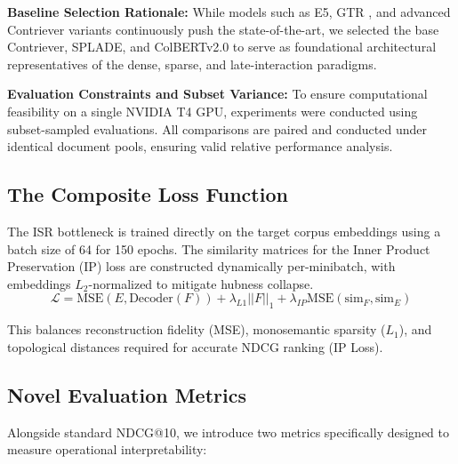 \documentclass[sigconf,authordraft]{acmart}
\begin{document}
\textbf{Baseline Selection Rationale:} While models such as E5, GTR \cite{wang2022}, and advanced Contriever variants continuously push the state-of-the-art, we selected the base Contriever, SPLADE, and ColBERTv2.0 to serve as foundational architectural representatives of the dense, sparse, and late-interaction paradigms.

\textbf{Evaluation Constraints and Subset Variance:} To ensure computational feasibility on a single NVIDIA T4 GPU, experiments were conducted using subset-sampled evaluations. All comparisons are paired and conducted under identical document pools, ensuring valid relative performance analysis.

\subsection{The Composite Loss Function}
The ISR bottleneck is trained directly on the target corpus embeddings using a batch size of 64 for 150 epochs. The similarity matrices for the Inner Product Preservation (IP) loss are constructed dynamically per-minibatch, with embeddings $L_2$-normalized to mitigate hubness collapse.
\begin{equation}
\mathcal{L} = \text{MSE}(E, \text{Decoder}(F)) + \lambda_{L1} ||F||_1 + \lambda_{IP} \text{MSE}(\text{sim}_F, \text{sim}_E)
\end{equation}

This balances reconstruction fidelity (MSE), monosemantic sparsity ($L_1$), and topological distances required for accurate NDCG ranking (IP Loss).

\subsection{Novel Evaluation Metrics}
Alongside standard NDCG@10, we introduce two metrics specifically designed to measure operational interpretability:
\end{document}

